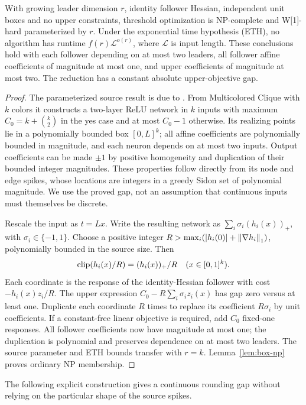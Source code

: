 \begin{theorem}\label{thm:growing-leader}
With growing leader dimension \(r\), identity follower Hessian, independent
unit boxes and no upper constraints, threshold optimization is NP-complete
and W[1]-hard parameterized by \(r\). Under the exponential time hypothesis
(ETH), no algorithm has runtime \(f(r)\mathcal L^{o(r)}\), where \(\mathcal L\)
is input length. These conclusions hold with each follower depending on at
most two leaders, all follower affine coefficients of magnitude at most one,
and upper coefficients of magnitude at most two. The reduction has a constant
absolute upper-objective gap.
\end{theorem}
\begin{proof}
The parameterized source result is due to
\citet[Proposition~4.1, Theorem~5.3 and Corollary~5.5]{FroeseEtAl2026}.
From Multicolored Clique with \(k\) colors it constructs a two-layer ReLU
network in \(k\) inputs with maximum \(C_0=k+\binom k2\) in the yes case and
at most \(C_0-1\) otherwise. Its realizing points lie in a polynomially bounded
box \([0,L]^k\); all affine coefficients are polynomially bounded in magnitude,
and each neuron depends on at most two inputs. Output coefficients can be
made \(\pm1\) by positive homogeneity and duplication of their bounded
integer magnitudes. These properties follow directly from its node and edge
spikes, whose locations are integers in a greedy Sidon set of polynomial
magnitude. We use the proved gap, not an assumption that continuous inputs
must themselves be discrete.

Rescale the input as \(t=Lx\). Write the resulting network as
\(\sum_i\sigma_i(h_i(x))_+\), with \(\sigma_i\in\{-1,1\}\). Choose a positive
integer \(R>\max_i(|h_i(0)|+\left\lVert\nabla h_i\right\rVert_1)\), polynomially bounded in
the source size. Then
\[
 \operatorname{clip}(h_i(x)/R)=(h_i(x))_+/R\quad(x\in[0,1]^k).
\]
Each coordinate is the response of the identity-Hessian follower with cost
\(-h_i(x)z_i/R\). The upper expression
\(C_0-R\sum_i\sigma_i z_i(x)\) has gap zero versus at least one.
Duplicate each coordinate \(R\) times to replace its coefficient \(R\sigma_i\)
by unit coefficients. If a constant-free linear objective is required, add
\(C_0\) fixed-one responses. All follower coefficients now have magnitude at
most one; the duplication is polynomial and preserves dependence on at most
two leaders. The source parameter and ETH bounds transfer with \(r=k\).
Lemma~\ref{lem:box-np} proves ordinary NP membership.
\end{proof}
The following explicit construction gives a continuous
rounding gap without relying on the particular shape of the source spikes.

